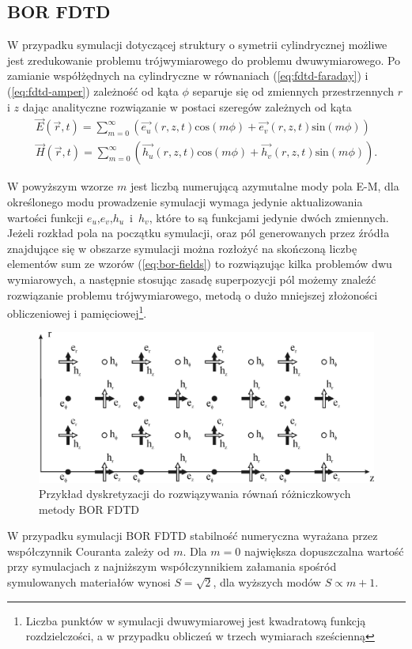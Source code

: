 \subsection{BOR FDTD}
\label{subart:borfdtd}
W przypadku symulacji dotyczącej struktury o symetrii cylindrycznej możliwe jest zredukowanie problemu trójwymiarowego do problemu dwuwymiarowego. Po zamianie współżędnych na cylindryczne w równaniach (\ref{eq:fdtd-faraday}) i (\ref{eq:fdtd-amper}) zależność od kąta $\phi$ separuje się od zmiennych przestrzennych $r$ i $z$ dając analityczne rozwiązanie w postaci szeregów zależnych od kąta
\begin{equation}
	\begin{gathered}
	\vec{E}(\vec{r},t)=\sum_{m=0}^{\infty}(\vec{e_u}(r,z,t) \textrm{cos}(m\phi)+\vec{e_v}(r,z,t)\textrm{sin}(m\phi)) \\
	\vec{H}(\vec{r},t)=\sum_{m=0}^{\infty}(\vec{h_u}(r,z,t) \textrm{cos}(m\phi)+\vec{h_v}(r,z,t)\textrm{sin}(m\phi)).
	\end{gathered}
	\label{eq:bor-fields}
\end{equation}

W powyższym wzorze $m$ jest liczbą numerującą azymutalne mody pola E-M, dla określonego modu prowadzenie symulacji wymaga jedynie aktualizowania wartości funkcji $e_u$,$e_v$,$h_u$~i~$h_v$, które to są funkcjami jedynie dwóch zmiennych. Jeżeli rozkład pola na początku symulacji, oraz pól generowanych przez źródła znajdujące się w obszarze symulacji można rozłożyć na skończoną liczbę elementów sum ze wzorów (\ref{eq:bor-fields}) to rozwiązując kilka problemów dwu wymiarowych, a następnie stosując zasadę superpozycji pól możemy znaleźć rozwiązanie problemu trójwymiarowego, metodą o dużo mniejszej złożoności obliczeniowej i pamięciowej\footnote{Liczba punktów w symulacji dwuwymiarowej jest kwadratową funkcją rozdzielczości, a w przypadku obliczeń w trzech wymiarach sześcienną}.

\begin{figure}
	\includegraphics[width=\textwidth]{subart/fdtd/R5_TFSF.png}
	\caption{Przykład dyskretyzacji do rozwiązywania równań różniczkowych metody BOR FDTD \cite{antosiewicz2009wplyw}}
	\label{fig:bor-dysk}
\end{figure}
W przypadku symulacji BOR FDTD stabilność numeryczna wyrażana przez współczynnik Couranta zależy od $m$. Dla $m=0$ największa dopuszczalna wartość przy symulacjach z najniższym współczynnikiem załamania spośród symulowanych materiałów wynosi $S=\sqrt{2}$, dla wyższych modów $S \propto m+1$. 

